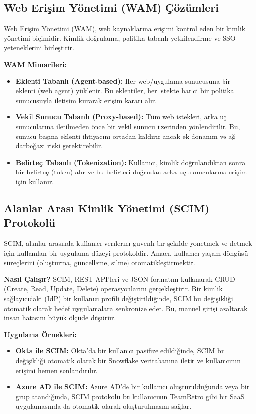 \subsection{Web Erişim Yönetimi (WAM) Çözümleri}

Web Erişim Yönetimi (WAM), web kaynaklarına erişimi kontrol eden bir kimlik yönetimi biçimidir. Kimlik doğrulama, politika tabanlı yetkilendirme ve SSO yeteneklerini birleştirir.

\textbf{WAM Mimarileri:}
\begin{itemize}
    \item \textbf{Eklenti Tabanlı (Agent-based):} Her web/uygulama sunucusuna bir eklenti (web agent) yüklenir. Bu eklentiler, her istekte harici bir politika sunucusuyla iletişim kurarak erişim kararı alır.
    \item \textbf{Vekil Sunucu Tabanlı (Proxy-based):} Tüm web istekleri, arka uç sunucularına iletilmeden önce bir vekil sunucu üzerinden yönlendirilir. Bu, sunucu başına eklenti ihtiyacını ortadan kaldırır ancak ek donanım ve ağ darboğazı riski gerektirebilir.
    \item \textbf{Belirteç Tabanlı (Tokenization):} Kullanıcı, kimlik doğrulandıktan sonra bir belirteç (token) alır ve bu belirteci doğrudan arka uç sunucularına erişim için kullanır.
\end{itemize}

\subsection{Alanlar Arası Kimlik Yönetimi (SCIM) Protokolü}

SCIM, alanlar arasında kullanıcı verilerini güvenli bir şekilde yönetmek ve iletmek için kullanılan bir uygulama düzeyi protokoldir. Amacı, kullanıcı yaşam döngüsü süreçlerini (oluşturma, güncelleme, silme) otomatikleştirmektir.

\textbf{Nasıl Çalışır?} SCIM, REST API'leri ve JSON formatını kullanarak CRUD (Create, Read, Update, Delete) operasyonlarını gerçekleştirir. Bir kimlik sağlayıcıdaki (IdP) bir kullanıcı profili değiştirildiğinde, SCIM bu değişikliği otomatik olarak hedef uygulamalara senkronize eder. Bu, manuel girişi azaltarak insan hatasını büyük ölçüde düşürür.

\textbf{Uygulama Örnekleri:}
\begin{itemize}
    \item \textbf{Okta ile SCIM:} Okta'da bir kullanıcı pasifize edildiğinde, SCIM bu değişikliği otomatik olarak bir Snowflake veritabanına iletir ve kullanıcının erişimi hemen sonlandırılır.
    \item \textbf{Azure AD ile SCIM:} Azure AD'de bir kullanıcı oluşturulduğunda veya bir grup atandığında, SCIM protokolü bu kullanıcının TeamRetro gibi bir SaaS uygulamasında da otomatik olarak oluşturulmasını sağlar.
\end{itemize}

